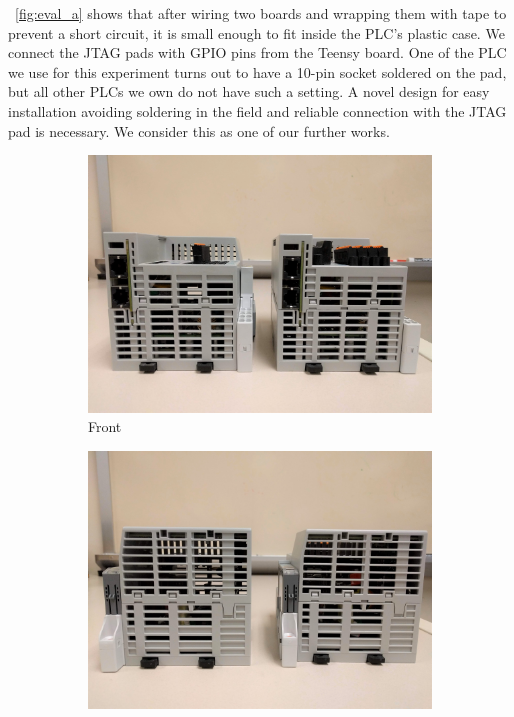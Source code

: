 ~\autoref{fig:eval_a} shows that after wiring two boards and wrapping them with tape to prevent a short circuit, it is small enough to fit inside the PLC's plastic case. We connect the JTAG pads with GPIO pins from the Teensy board. One of the PLC we use for this experiment turns out to have a 10-pin socket soldered on the pad, but all other PLCs we own do not have such a setting. A novel design for easy installation avoiding soldering in the field and reliable connection with the JTAG pad is necessary. We consider this as one of our further works.

\begin{figure}[h]
	\centering
    \begin{subfigure}[b]{0.22\textwidth}
    	\centering
	\includegraphics[width=1\textwidth]{figures/eval_b2}
        \vspace{-0.15in}
        \caption{Front}
		\label{fig:eval_b1}
	\end{subfigure}
	\begin{subfigure}[b]{0.22\textwidth}
    	\centering
	\includegraphics[width=1\textwidth]{figures/eval_b1}

\end{subfigure}
\end{figure}
